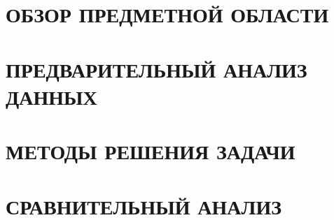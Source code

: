 \documentclass[a4paper,14pt,russian]{extreport}
\begin{document}

\tableofcontents

\newpage
{}


\chapter{ОБЗОР ПРЕДМЕТНОЙ ОБЛАСТИ}


\chapter{ПРЕДВАРИТЕЛЬНЫЙ АНАЛИЗ ДАННЫХ}


\chapter{МЕТОДЫ РЕШЕНИЯ ЗАДАЧИ}


\chapter{СРАВНИТЕЛЬНЫЙ АНАЛИЗ}


\newpage
{}


\newpage


\newpage
\listoffigures
\newpage
\listoftables
\end{document}
